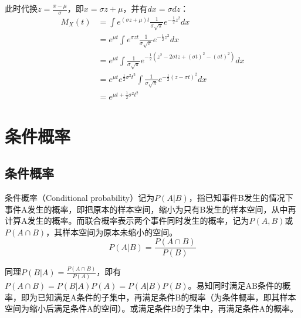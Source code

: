 \documentclass[11pt]{article}
\begin{document}
此时代换$z=\frac{x-\mu}{\sigma}$，即$x= \sigma z + \mu$，并有$dx=\sigma dz$：
\begin{align*}
    M_X(t) &= \int e^{(\sigma z + \mu)t} \frac{1}{\sigma\sqrt{\pi}} e^{-\frac{1}{2}z^2}dx \\
    &= e^{\mu t} \int e^{\sigma z t} \frac{1}{\sigma\sqrt{\pi}} e^{-\frac{1}{2}z^2}dx \\
    &= e^{\mu t} \int \frac{1}{\sigma\sqrt{\pi}} e^{-\frac{1}{2} (z^2 -2\sigma t z + (\sigma t)^2 -(\sigma t)^2)}dx \\
    &= e^{\mu t} e^{\frac{1}{2} \sigma^2 t^2} \int \frac{1}{\sigma\sqrt{\pi}} e^{-\frac{1}{2} (z - \sigma t)^2}dx \\
    &= e^{\mu t + \frac{1}{2} \sigma^2 t^2}
\end{align*}

\section{条件概率}

\subsection{条件概率}

条件概率（Conditional probability）记为$P(A|B)$，指已知事件B发生的情况下事件A发生的概率，即把原本的样本空间，缩小为只有B发生的样本空间，从中再计算A发生的概率。而联合概率表示两个事件同时发生的概率，记为$P(A,B)$或$P(A\cap B)$，其样本空间为原本未缩小的空间。
\begin{equation*}
    P(A|B) = \frac{P(A \cap B)}{P(B)}
\end{equation*}

\begin{remark}
    同理$P(B|A) = \frac{P(A \cap B)}{P(A)}$，即有$P(A \cap B) = P(B|A)P(A) = P(A|B)P(B)$。易知同时满足AB条件的概率，即为已知满足A条件的子集中，再满足条件B的概率（为条件概率，即其样本空间为缩小后满足条件A的空间）。或满足条件B的子集中，再满足条件A的概率。
\end{remark}
\end{document}
